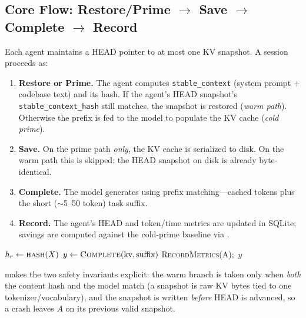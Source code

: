 \documentclass[10pt]{article}
\begin{document}
\subsection{Core Flow: Restore/Prime $\rightarrow$ Save $\rightarrow$ Complete $\rightarrow$ Record}
Each agent maintains a HEAD pointer to at most one KV snapshot. A session
proceeds as:
\begin{enumerate}
  \item \textbf{Restore or Prime.} The agent computes
  \texttt{stable\_context} (system prompt $+$ codebase text) and its hash. If the
  agent's HEAD snapshot's \texttt{stable\_context\_hash} still matches, the
  snapshot is restored (\emph{warm path}). Otherwise the prefix is fed to the
  model to populate the KV cache (\emph{cold prime}).
  \item \textbf{Save.} On the prime path \emph{only}, the KV cache is serialized
  to disk. On the warm path this is skipped: the HEAD snapshot on disk is already
  byte-identical.
  \item \textbf{Complete.} The model generates using prefix matching---cached
  tokens plus the short ($\sim$5--50 token) task suffix.
  \item \textbf{Record.} The agent's HEAD and token/time metrics are updated in
  SQLite; savings are computed against the cold-prime baseline via
  .
\end{enumerate}

\begin{algorithm}[t]
\footnotesize
\DontPrintSemicolon
\caption{Restore-or-Prime session (self-hosted)}
\label{alg:restore}
$h_r \leftarrow \textsc{hash}(X)$\;
$y \leftarrow \textsc{Complete}(\text{kv}, \text{suffix})$\;
\textsc{RecordMetrics}(A);\ \Return $y$\;
\end{algorithm}

 makes the two safety invariants explicit: the warm branch is
taken only when \emph{both} the content hash and the model match (a snapshot is
raw KV bytes tied to one tokenizer/vocabulary), and the snapshot is written
\emph{before} HEAD is advanced, so a crash leaves $A$ on its previous valid
snapshot.
\end{document}
